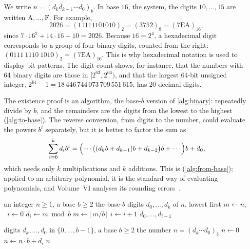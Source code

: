 We write $n=(d_kd_{k-1}\cdots d_0)_b$. In base $16$, the  system, the digits $10,\ldots,15$ are written $\mathrm A,\ldots,\mathrm F$. For example,
\[
2026=(11111101010)_2=(3752)_8=(\mathrm{7EA})_{16},
\]
since $7\cdot16^2+14\cdot16+10=2026$. Because $16=2^4$, a hexadecimal digit corresponds to a group of four binary digits, counted from the right: $(0111\ 1110\ 1010)_2=(\mathrm{7EA})_{16}$. This is why hexadecimal notation is used to display bit patterns. The digit count shows, for instance, that the numbers with $64$ binary digits are those in $[2^{63},2^{64})$, and that the largest $64$-bit unsigned integer, $2^{64}-1=18\,446\,744\,073\,709\,551\,615$, has $20$ decimal digits.

The existence proof is an algorithm, the base-$b$ version of \cref{alg:binary}: repeatedly divide by $b$, and the remainders are the digits from the lowest to the highest (\cref{alg:to-base}). The reverse conversion, from digits to the number, could evaluate the powers $b^i$ separately, but it is better to factor the sum as
\[
\sum_{i=0}^kd_ib^i=\Bigl(\cdots\bigl((d_kb+d_{k-1})b+d_{k-2}\bigr)b+\cdots\Bigr)b+d_0 ,
\]
which needs only $k$ multiplications and $k$ additions. This is  (\cref{alg:from-base}); applied to an arbitrary polynomial, it is the standard way of evaluating polynomials, and Volume~VI analyses its rounding errors~\cite[Sect.~4.6.4]{knuth1997taocp2}.

\begin{algorithm}
\begin{algorithmic}[1]
\Require an integer $n\ge1$, a base $b\ge2$
\Ensure the base-$b$ digits $d_0,\ldots,d_k$ of $n$, lowest first
\State $m\gets n$; \ $i\gets0$
 
  \State $d_i\gets m\bmod b$
  \State $m\gets\lfloor m/b\rfloor$
  \State $i\gets i+1$
\EndWhile
\State \Return $d_0,\ldots,d_{i-1}$
\end{algorithmic}
\caption{Conversion of an integer to base $b$ by repeated division.}
\label{alg:to-base}
\end{algorithm}

\begin{algorithm}
\begin{algorithmic}[1]
\Require digits $d_k,\ldots,d_0$ in $\{0,\ldots,b-1\}$, a base $b\ge2$
\Ensure the number $n=(d_k\cdots d_0)_b$
\State $n\gets0$
 
  \State $n\gets n\cdot b+d_i$
\EndFor
\State \Return $n$
\end{algorithmic}
\caption{Conversion of digits to a number by Horner's scheme.}
\label{alg:from-base}
\end{algorithm}

